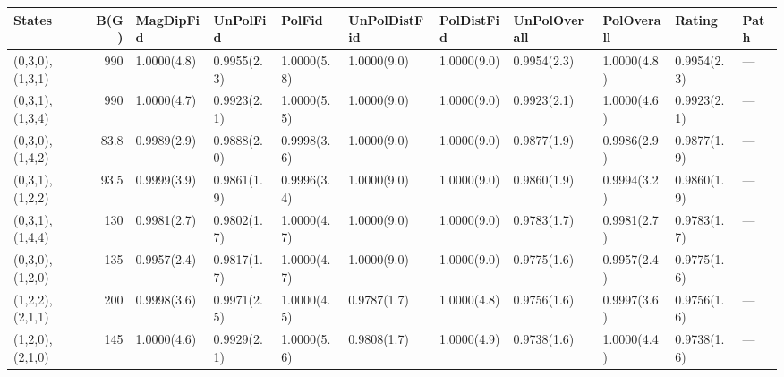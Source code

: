 \begin{tabular}{lrlllllllll}
\hline
 States          &   B(G) & MagDipFid   & UnPolFid    & PolFid      & UnPolDistFid   & PolDistFid   & UnPolOverall   & PolOverall   & Rating      & Path   \\
\hline
 (0,3,0),(1,3,1) &  990   & 1.0000(4.8) & 0.9955(2.3) & 1.0000(5.8) & 1.0000(9.0)    & 1.0000(9.0)  & 0.9954(2.3)    & 1.0000(4.8)  & 0.9954(2.3) & ---    \\
 (0,3,1),(1,3,4) &  990   & 1.0000(4.7) & 0.9923(2.1) & 1.0000(5.5) & 1.0000(9.0)    & 1.0000(9.0)  & 0.9923(2.1)    & 1.0000(4.6)  & 0.9923(2.1) & ---    \\
 (0,3,0),(1,4,2) &   83.8 & 0.9989(2.9) & 0.9888(2.0) & 0.9998(3.6) & 1.0000(9.0)    & 1.0000(9.0)  & 0.9877(1.9)    & 0.9986(2.9)  & 0.9877(1.9) & ---    \\
 (0,3,1),(1,2,2) &   93.5 & 0.9999(3.9) & 0.9861(1.9) & 0.9996(3.4) & 1.0000(9.0)    & 1.0000(9.0)  & 0.9860(1.9)    & 0.9994(3.2)  & 0.9860(1.9) & ---    \\
 (0,3,1),(1,4,4) &  130   & 0.9981(2.7) & 0.9802(1.7) & 1.0000(4.7) & 1.0000(9.0)    & 1.0000(9.0)  & 0.9783(1.7)    & 0.9981(2.7)  & 0.9783(1.7) & ---    \\
 (0,3,0),(1,2,0) &  135   & 0.9957(2.4) & 0.9817(1.7) & 1.0000(4.7) & 1.0000(9.0)    & 1.0000(9.0)  & 0.9775(1.6)    & 0.9957(2.4)  & 0.9775(1.6) & ---    \\
 (1,2,2),(2,1,1) &  200   & 0.9998(3.6) & 0.9971(2.5) & 1.0000(4.5) & 0.9787(1.7)    & 1.0000(4.8)  & 0.9756(1.6)    & 0.9997(3.6)  & 0.9756(1.6) & ---    \\
 (1,2,0),(2,1,0) &  145   & 1.0000(4.6) & 0.9929(2.1) & 1.0000(5.6) & 0.9808(1.7)    & 1.0000(4.9)  & 0.9738(1.6)    & 1.0000(4.4)  & 0.9738(1.6) & ---    \\
\hline
\end{tabular}